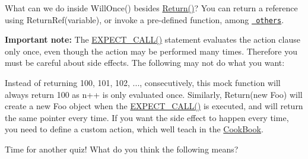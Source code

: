 What can we do inside {\ttfamily Will\+Once()} besides {\ttfamily \mbox{\hyperlink{namespacetesting_adae3994eb444d1ad2dd602454b854663}{Return()}}}? You can return a reference using {\ttfamily Return\+Ref(variable)}, or invoke a pre-\/defined function, among \href{CheatSheet.md\#actions}{\texttt{ others}}.

{\bfseries{Important note\+:}} The {\ttfamily \mbox{\hyperlink{googletest-master_2googlemock_2include_2gmock_2gmock-spec-builders_8h_a535a6156de72c1a2e25a127e38ee5232}{E\+X\+P\+E\+C\+T\+\_\+\+C\+A\+L\+L()}}} statement evaluates the action clause only once, even though the action may be performed many times. Therefore you must be careful about side effects. The following may not do what you want\+:


\begin{DoxyCode}{0}
\end{DoxyCode}


Instead of returning 100, 101, 102, ..., consecutively, this mock function will always return 100 as {\ttfamily n++} is only evaluated once. Similarly, {\ttfamily Return(new Foo)} will create a new {\ttfamily Foo} object when the {\ttfamily \mbox{\hyperlink{googletest-master_2googlemock_2include_2gmock_2gmock-spec-builders_8h_a535a6156de72c1a2e25a127e38ee5232}{E\+X\+P\+E\+C\+T\+\_\+\+C\+A\+L\+L()}}} is executed, and will return the same pointer every time. If you want the side effect to happen every time, you need to define a custom action, which we\textquotesingle{}ll teach in the \mbox{\hyperlink{_obj__test_2lib_2googletest-release-1_88_81_2googlemock_2docs_2_cook_book_8md}{Cook\+Book}}.

Time for another quiz! What do you think the following means?


\begin{DoxyCode}{0}
\end{DoxyCode}



